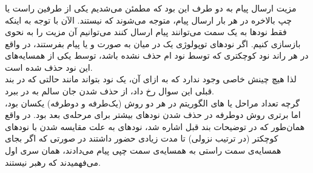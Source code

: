 \documentclass{article}
\begin{document}
\begin{multicols}{2}
\subsubsection{}
مزیت ارسال پیام به دو طرف این بود که مطمئن می‌شدیم یکی از طرفین راست یا چپ بالاخره در هر بار ارسال پیام، متوجه می‌شوند که 
نیستند. الآن با توجه به اینکه فقط نودها به یک سمت می‌توانند پیام ارسال کنند می‌توانیم آن مزیت را به نحوی بازسازی کنیم. اگر نودهای توپولوژی یک در میان به صورت
و یا
پیام بفرستند، در واقع در هر راند نود کوچکتری که توسط نود
ام حذف نشده باشد، توسط یکی از همسایه‌های این نود حذف شده است.\\
لذا هیچ چینش 
خاصی وجود ندارد که به ازای آن، یک نود
بتواند مانند حالتی که در بند قبلی این سوال رخ داد، از حذف شدن جان سالم به در ببرد.\\
گرچه تعداد مراحل یا
های الگوریتم در هر دو روش (یک‌طرفه و دوطرفه) یکسان بود، اما برتری روش دوطرفه در حذف شدن نودهای بیشتر برای مرحله‌ی بعد بود. در واقع همان‌طور که در توضیحات بند قبل اشاره شد، نودهای
به علت مقایسه شدن با نودهای کوچکتر (در ترتیب نزولی) تا مدت زیادی حضور داشتند در صورتی که اگر بجای همسایه‌ی سمت راستی به همسایه‌ی سمت چپی پیام می‌دادند، همان سری اول می‌فهمیدند که رهبر نیستند.

\end{multicols}
\end{document}
